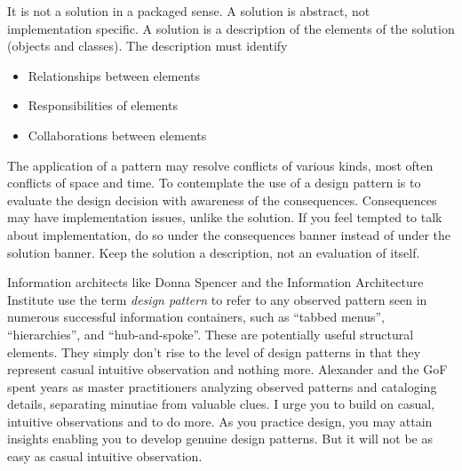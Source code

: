 \hypertarget{a-solution-is-a-description-of-objects-and-classes}{%
\label{a-solution-is-a-description-of-objects-and-classes}}

It is not a solution in a packaged sense. A solution is abstract, not
implementation specific. A solution is a description of the elements of
the solution (objects and classes). The description must identify

\begin{itemize}
\tightlist
\item
  Relationships between elements
\item
  Responsibilities of elements
\item
  Collaborations between elements
\end{itemize}

\hypertarget{a-consequence-is-a-result-or-trade-off}{%
\label{a-consequence-is-a-result-or-trade-off}}

The application of a pattern may resolve conflicts of various kinds,
most often conflicts of space and time. To contemplate the use of a
design pattern is to evaluate the design decision with awareness of the
consequences. Consequences may have implementation issues, unlike the
solution. If you feel tempted to talk about implementation, do so under
the consequences banner instead of under the solution banner. Keep the
solution a description, not an evaluation of itself.

\hypertarget{design-patterns-in-information-architecture}{%
\label{design-patterns-in-information-architecture}}

Information architects like Donna Spencer and the Information
Architecture Institute use the term \emph{design pattern} to refer to
any observed pattern seen in numerous successful information containers,
such as ``tabbed menus'', ``hierarchies'', and ``hub-and-spoke''. These
are potentially useful structural elements. They simply don't rise to
the level of design patterns in that they represent casual intuitive
observation and nothing more. Alexander and the GoF spent years as
master practitioners analyzing observed patterns and cataloging details,
separating minutiae from valuable clues. I urge you to build on casual,
intuitive observations and to do more. As you practice design, you may
attain insights enabling you to develop genuine design patterns. But it
will not be as easy as casual intuitive observation.

